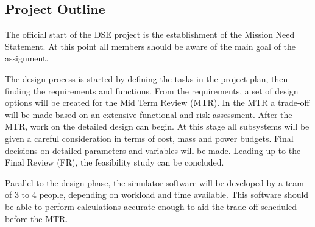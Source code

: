 \subsection{Project Outline}
The official start of the DSE project is the establishment of the Mission Need Statement. At this point all members should be aware of the main goal of the assignment.

The design process is started by defining the tasks in the project plan, then finding the requirements and functions. From the requirements, a set of design options will be created for the Mid Term Review (MTR). In the MTR a trade-off will be made based on an extensive functional and risk assessment. After the MTR, work on the detailed design can begin. At this stage all subsystems will be given a careful consideration in terms of cost, mass and power budgets. Final decisions on detailed parameters and variables will be made. Leading up to the Final Review (FR), the feasibility study can be concluded.

Parallel to the design phase, the simulator software will be developed by a team of 3 to 4 people, depending on workload and time available. This software should be able to perform calculations accurate enough to aid the trade-off scheduled before the MTR.